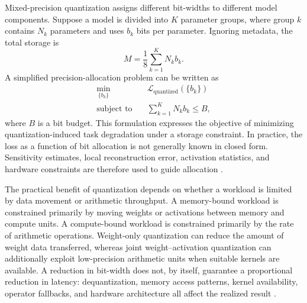 Mixed-precision quantization assigns different bit-widths to different
model components. Suppose a model is divided into \(K\) parameter
groups, where group \(k\) contains \(N_k\) parameters and uses \(b_k\)
bits per parameter. Ignoring metadata, the total storage is
\begin{equation}
    M
    =
    \frac{1}{8}
    \sum_{k=1}^{K}N_kb_k.
    \label{eq:quant-mixed-precision-memory}
\end{equation}
A simplified precision-allocation problem can be written as
\begin{equation}
    \begin{aligned}
        \min_{\{b_k\}}\quad&
        \mathcal{L}_{\mathrm{quantized}}(\{b_k\})\\
        \text{subject to}\quad&
        \sum_{k=1}^{K}N_kb_k\leq B,
    \end{aligned}
    \label{eq:quant-bit-allocation}
\end{equation}
where \(B\) is a bit budget. This formulation expresses the objective
of minimizing quantization-induced task degradation under a storage
constraint. In practice, the loss as a function of bit allocation is
not generally known in closed form. Sensitivity estimates, local
reconstruction error, activation statistics, and hardware constraints
are therefore used to guide allocation
\parencite{song2026targetcentricqat,chen2026llmquantization}.

The practical benefit of quantization depends on whether a workload is
limited by data movement or arithmetic throughput. A memory-bound
workload is constrained primarily by moving weights or activations
between memory and compute units. A compute-bound workload is
constrained primarily by the rate of arithmetic operations. Weight-only
quantization can reduce the amount of weight data transferred, whereas
joint weight--activation quantization can additionally exploit
low-precision arithmetic units when suitable kernels are available.
A reduction in bit-width does not, by itself, guarantee a proportional
reduction in latency: dequantization, memory access patterns, kernel
availability, operator fallbacks, and hardware architecture all affect
the realized result \parencite{chen2026llmquantization}.

